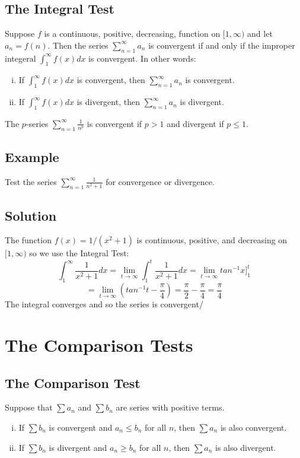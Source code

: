 \subsection*{The Integral Test}
Suppose $f$ is a continuous, positive, decreasing, function on $[1, \infty)$ and let
$a_n = f(n)$. Then the series $\sum_{n=1}^\infty a_n$ is convergent if and only if
the improper integeral $\int_1^\infty f(x) dx$ is convergent. In other words:
\begin{enumerate}[(i)]
    \item If $\int_1^\infty f(x) dx$ is convergent, then $\sum_{n=1}^\infty a_n$ is convergent.
    \item If $\int_1^\infty f(x) dx$ is divergent, then $\sum_{n=1}^\infty a_n$ is divergent.
\end{enumerate}
The $p$-series $\sum_{n=1}^\infty \frac{1}{n^p}$ is convergent if $p>1$ and divergent if $p \leq 1$.

\subsection*{Example}
Test the series $\sum_{n=1}^\infty\frac{1}{n^2+1}$ for convergence or divergence.

\subsection*{Solution}
The function $f(x)=1/(x^2+1)$ is continuous, positive, and decreasing on $[1,\infty)$
so we use the Integral Test:
$$\int_1^\infty \frac{1}{x^2+1}dx=\lim_{t\to\infty}\int_1^t\frac{1}{x^2+1}dx=
    \lim_{t\to\infty}tan^{-1}x]_1^t$$
$$=\lim_{t\to\infty}\left(tan^{-1}t-\frac{\pi}{4}\right)=\frac{\pi}{2}-\frac{\pi}{4}=\frac{\pi}{4}$$
The integral converges and so the series is convergent/

\section{The Comparison Tests}

\subsection*{The Comparison Test}
Suppose that $\sum a_n$ and $\sum b_n$ are series with positive terms.
\begin{enumerate}[(i)]
    \item If $\sum b_n$ is convergent and $a_n \leq b_n$ for all $n$, then $\sum a_n$ is also convergent.
    \item If $\sum b_n$ is divergent and $a_n \geq b_n$ for all $n$, then $\sum a_n$ is also divergent.
\end{enumerate}

